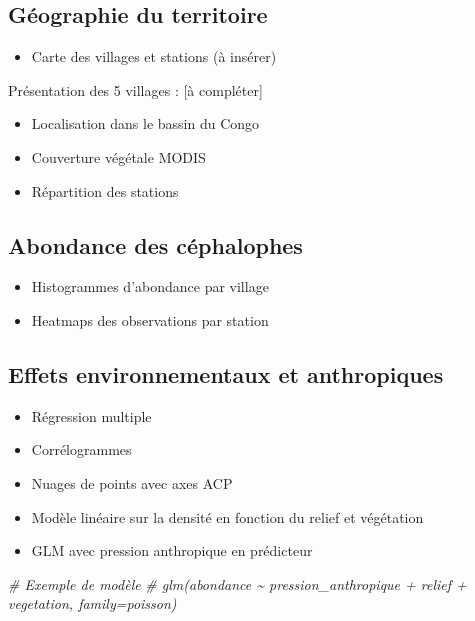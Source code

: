 \documentclass[
]{article}
\newenvironment{Shaded}{\begin{snugshade}}{\end{snugshade}}
\newcommand{\CommentTok}[1]{\textcolor[rgb]{0.56,0.35,0.01}{\textit{#1}}}
\providecommand{\tightlist}{%
  \setlength{\itemsep}{0pt}\setlength{\parskip}{0pt}}
\begin{document}
\subsection{Géographie du territoire}\label{guxe9ographie-du-territoire}

\begin{itemize}
\tightlist
\item
  Carte des villages et stations (à insérer)
\end{itemize}

Présentation des 5 villages : {[}à compléter{]}

\begin{itemize}
\tightlist
\item
  Localisation dans le bassin du Congo
\item
  Couverture végétale MODIS
\item
  Répartition des stations
\end{itemize}

\subsection{Abondance des céphalophes}\label{abondance-des-cuxe9phalophes}

\begin{itemize}
\tightlist
\item
  Histogrammes d'abondance par village
\item
  Heatmaps des observations par station
\end{itemize}

\subsection{Effets environnementaux et anthropiques}\label{effets-environnementaux-et-anthropiques}

\begin{itemize}
\item
  Régression multiple
\item
  Corrélogrammes
\item
  Nuages de points avec axes ACP
\item
  Modèle linéaire sur la densité en fonction du relief et végétation
\item
  GLM avec pression anthropique en prédicteur
\end{itemize}

\begin{Shaded}
\begin{Highlighting}[]
\CommentTok{\# Exemple de modèle}
\CommentTok{\# glm(abondance \textasciitilde{} pression\_anthropique + relief + vegetation, family=poisson)}
\end{Highlighting}
\end{Shaded}
\end{document}
